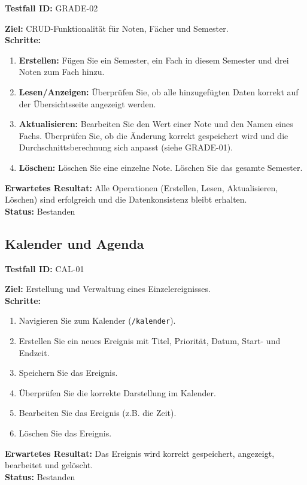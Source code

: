 \documentclass[11pt, a4paper]{article}
\newenvironment{testcase}[1]{%
    \par\vspace{1em}\noindent\begin{minipage}{\linewidth}
    \textbf{Testfall ID:} #1 \\
    \vspace{0.2em}
}{\end{minipage}\par\vspace{1em}}
\begin{document}
\begin{testcase}{GRADE-02}
    \textbf{Ziel:} CRUD-Funktionalität für Noten, Fächer und Semester.\\
    \textbf{Schritte:}
    \begin{enumerate}[label=\arabic*.]
        \item \textbf{Erstellen:} Fügen Sie ein Semester, ein Fach in diesem Semester und drei Noten zum Fach hinzu.
        \item \textbf{Lesen/Anzeigen:} Überprüfen Sie, ob alle hinzugefügten Daten korrekt auf der Übersichtsseite angezeigt werden.
        \item \textbf{Aktualisieren:} Bearbeiten Sie den Wert einer Note und den Namen eines Fachs. Überprüfen Sie, ob die Änderung korrekt gespeichert wird und die Durchschnittsberechnung sich anpasst (siehe GRADE-01).
        \item \textbf{Löschen:} Löschen Sie eine einzelne Note. Löschen Sie das gesamte Semester.
    \end{enumerate}
    \textbf{Erwartetes Resultat:} Alle Operationen (Erstellen, Lesen, Aktualisieren, Löschen) sind erfolgreich und die Datenkonsistenz bleibt erhalten.\\
    \vspace{0.5em}\textbf{Status:} \textcolor{passcolor}{Bestanden}
\end{testcase}

\subsection{Kalender und Agenda}

\begin{testcase}{CAL-01}
    \textbf{Ziel:} Erstellung und Verwaltung eines Einzelereignisses.\\
    \textbf{Schritte:}
    \begin{enumerate}[label=\arabic*.]
        \item Navigieren Sie zum Kalender (\texttt{/kalender}).
        \item Erstellen Sie ein neues Ereignis mit Titel, Priorität, Datum, Start- und Endzeit.
        \item Speichern Sie das Ereignis.
        \item Überprüfen Sie die korrekte Darstellung im Kalender.
        \item Bearbeiten Sie das Ereignis (z.B. die Zeit).
        \item Löschen Sie das Ereignis.
    \end{enumerate}
    \textbf{Erwartetes Resultat:} Das Ereignis wird korrekt gespeichert, angezeigt, bearbeitet und gelöscht.\\
    \vspace{0.5em}\textbf{Status:} \textcolor{passcolor}{Bestanden}
\end{testcase}
\end{document}
